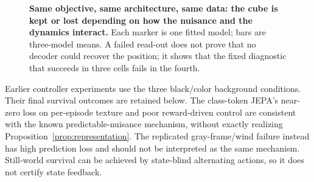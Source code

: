 \begin{table}[t]
\centering
\caption{\textbf{Detaching the target does not rescue the wind cell and costs the deterministic
one.} Position read-out error (mean absolute pixel error per coordinate), mean $\pm$ sample
standard deviation over three model seeds; each seed pair shares initialization and data order.}
\label{tab:target-gradient}
\end{table}

\begin{figure}[t]
\centering
{}
\caption{\textbf{Same objective, same architecture, same data: the cube is kept or lost depending
on how the nuisance and the dynamics interact.} Each marker is one fitted model; bars are
three-model means. A failed read-out does not prove that no decoder could recover the position;
it shows that the fixed diagnostic that succeeds in three cells fails in the fourth.}
\label{fig:cube-readout}
\end{figure}

\begin{table}[t]
\centering
\caption{Seed-0 cube position L1 error (pixels) for the grid and class-token JEPAs. ``Real'' evaluates
held-out encoded frames; ``Pred. 8'' evaluates the same read-out on eight-step predicted latents.
Gray conditions use more training transitions than black and color conditions.}
\label{tab:cube-readouts}
\end{table}

\begin{table}[t]
\centering
\caption{Seed-0 flow cube position L1 error (pixels). Latent and pixel columns use different
supervised read-outs. The persistent-color failure is visible before dynamics: real encoded position
has large error. These are model-recipe references rather than objective-only comparisons.}
\label{tab:cube-flow}
\end{table}

Earlier controller experiments use the three black/color background conditions. Their final
survival outcomes are retained below. The class-token JEPA's near-zero loss on per-episode texture
and poor reward-driven control are consistent with the known predictable-nuisance mechanism,
without exactly realizing Proposition~\ref{prop:representation}. The replicated gray-frame/wind
failure instead has high prediction loss and should not be interpreted as the same mechanism.
Still-world survival can be achieved by state-blind alternating actions, so it does not certify
state feedback.

